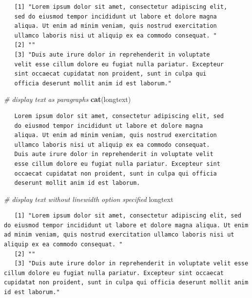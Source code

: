 \documentclass[12pt, twoside]{amherstthesis}
\newenvironment{Shaded}{\begin{snugshade}}{\end{snugshade}}
\newcommand{\CommentTok}[1]{\textcolor[rgb]{0.56,0.35,0.01}{\textit{#1}}}
\newcommand{\KeywordTok}[1]{\textcolor[rgb]{0.13,0.29,0.53}{\textbf{#1}}}
\newcommand{\NormalTok}[1]{#1}
\theoremstyle{definition}
\theoremstyle{definition}
\theoremstyle{definition}
\theoremstyle{remark}
\begin{document}
\begin{verbatim}
   [1] "Lorem ipsum dolor sit amet, consectetur adipiscing elit,
   sed do eiusmod tempor incididunt ut labore et dolore magna
   aliqua. Ut enim ad minim veniam, quis nostrud exercitation
   ullamco laboris nisi ut aliquip ex ea commodo consequat. "
   [2] ""
   [3] "Duis aute irure dolor in reprehenderit in voluptate
   velit esse cillum dolore eu fugiat nulla pariatur. Excepteur
   sint occaecat cupidatat non proident, sunt in culpa qui
   officia deserunt mollit anim id est laborum."
\end{verbatim}
\begin{Shaded}
\begin{Highlighting}[]
\CommentTok{# display text as paragraphs}
\KeywordTok{cat}\NormalTok{(longtext)}
\end{Highlighting}
\end{Shaded}
\begin{verbatim}
   Lorem ipsum dolor sit amet, consectetur adipiscing elit, sed
   do eiusmod tempor incididunt ut labore et dolore magna
   aliqua. Ut enim ad minim veniam, quis nostrud exercitation
   ullamco laboris nisi ut aliquip ex ea commodo consequat.
   Duis aute irure dolor in reprehenderit in voluptate velit
   esse cillum dolore eu fugiat nulla pariatur. Excepteur sint
   occaecat cupidatat non proident, sunt in culpa qui officia
   deserunt mollit anim id est laborum.
\end{verbatim}
\begin{Shaded}
\begin{Highlighting}[]
\CommentTok{# display text without linewidth option specified}
\NormalTok{longtext}
\end{Highlighting}
\end{Shaded}
\begin{verbatim}
   [1] "Lorem ipsum dolor sit amet, consectetur adipiscing elit, sed do eiusmod tempor incididunt ut labore et dolore magna aliqua. Ut enim ad minim veniam, quis nostrud exercitation ullamco laboris nisi ut aliquip ex ea commodo consequat. "
   [2] ""                                                                                                                                                                                                                                        
   [3] "Duis aute irure dolor in reprehenderit in voluptate velit esse cillum dolore eu fugiat nulla pariatur. Excepteur sint occaecat cupidatat non proident, sunt in culpa qui officia deserunt mollit anim id est laborum."
\end{verbatim}
\end{document}
